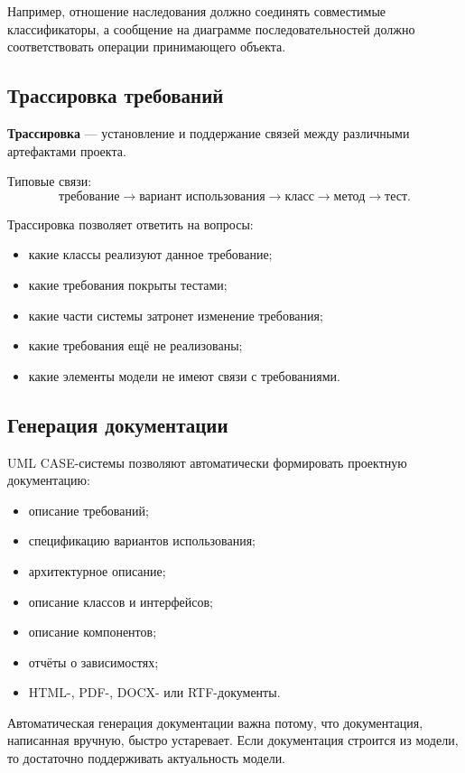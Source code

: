 \documentclass[12pt,a4paper]{article}
\begin{document}
Например, отношение наследования должно соединять совместимые классификаторы, а сообщение на диаграмме последовательностей должно соответствовать операции принимающего объекта.

\subsection{Трассировка требований}

\textbf{Трассировка} --- установление и поддержание связей между различными артефактами проекта.

Типовые связи:
\[
\text{требование} \rightarrow \text{вариант использования} \rightarrow \text{класс} \rightarrow \text{метод} \rightarrow \text{тест}.
\]

Трассировка позволяет ответить на вопросы:
\begin{itemize}
    \item какие классы реализуют данное требование;
    \item какие требования покрыты тестами;
    \item какие части системы затронет изменение требования;
    \item какие требования ещё не реализованы;
    \item какие элементы модели не имеют связи с требованиями.
\end{itemize}

\subsection{Генерация документации}

UML CASE-системы позволяют автоматически формировать проектную документацию:
\begin{itemize}
    \item описание требований;
    \item спецификацию вариантов использования;
    \item архитектурное описание;
    \item описание классов и интерфейсов;
    \item описание компонентов;
    \item отчёты о зависимостях;
    \item HTML-, PDF-, DOCX- или RTF-документы.
\end{itemize}

Автоматическая генерация документации важна потому, что документация, написанная вручную, быстро устаревает. Если документация строится из модели, то достаточно поддерживать актуальность модели.
\end{document}
